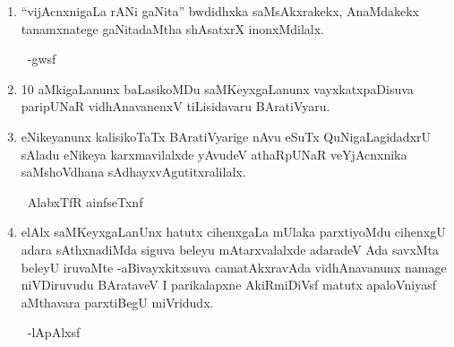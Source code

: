\begin{enumerate}[\rm 1)]
\item ``vijAcnxnigaLa rANi gaNita'' bwdidhxka saMsAkxrakekx, AnaMdakekx tanamxnatege gaNitadaMtha shAsatxrX inonxMdilalx.

~\hfill -gwsf

\item {\rm 10} aMkigaLanunx baLasikoMDu saMKeyxgaLanunx vayxkatxpaDisuva paripUNaR vidhAna\-vanenxV tiLisidavaru BAratiVyaru.

\item eNikeyanunx kalisikoTaTx BAratiVyarige nAvu eSuTx QuNigaLagidadxrU sAladu eNikeya karxmavilalxde yAvudeV athaRpUNaR veYjAcnxnika saMshoVdhana sAdhayx\-vAgutitxralilalx.

~\hfill AlabxTfR ainfseTxnf

\item elAlx saMKeyxgaLanUnx hatutx cihenxgaLa mUlaka parxtiyoMdu cihenxgU adara sAthxnadiMda siguva beleyu mAtarxvalalxde adaradeV Ada savxMta beleyU iruvaMte -aBivayxkitxsuva camatAkxravAda vidhAnavanunx namage niVDiruvudu BArataveV I parikalapxne AkiRmiDiVsf matutx apaloVniyasf aMthavara parxtiBegU miVridudx.

~\hfill -lApAlxsf
\end{enumerate}
